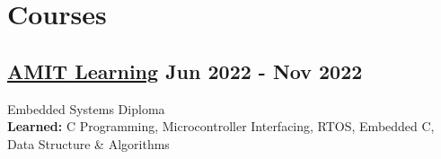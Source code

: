 \section*{Courses}
%
%
%
\subsection*{
  \href{https://amit-learning.com/}{AMIT Learning}
  \hspace*{\fill}
  \dateformat Jun 2022 - Nov 2022
}
Embedded Systems Diploma\\
\textbf{Learned:} C Programming, Microcontroller Interfacing, RTOS, Embedded C, Data Structure \& Algorithms